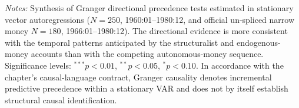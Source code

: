 \begin{table}[htbp]
{\begin{tabularx}{1.15\textwidth}{llXX>{\RaggedRight}X}
\end{tabularx}%
}
\begin{minipage}{0.96\textwidth}
\vspace{0.3em}
\footnotesize \textit{Notes:} Synthesis of Granger directional precedence tests estimated in stationary vector autoregressions ($N=250$, 1960:01--1980:12, and official un-spliced narrow money $N=180$, 1966:01--1980:12). The directional evidence is more consistent with the temporal patterns anticipated by the structuralist and endogenous-money accounts than with the competing autonomous-money sequence. Significance levels: $^{***} p < 0.01$, $^{**} p < 0.05$, $^{*} p < 0.10$. In accordance with the chapter's causal-language contract, Granger causality denotes incremental predictive precedence within a stationary VAR and does not by itself establish structural causal identification.
\end{minipage}
\end{table}
